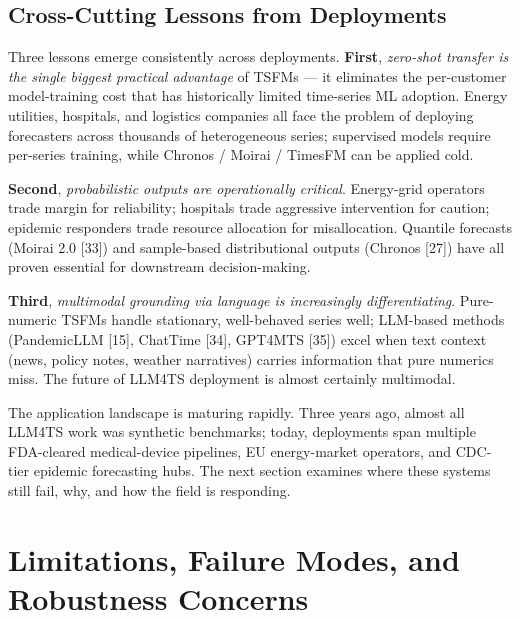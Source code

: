 \documentclass{article}
\begin{document}
\subsection{Cross-Cutting Lessons from Deployments}\label{cross-cutting-lessons-from-deployments}

Three lessons emerge consistently across deployments. \textbf{First}, \emph{zero-shot transfer is the single biggest practical advantage} of TSFMs --- it eliminates the per-customer model-training cost that has historically limited time-series ML adoption. Energy utilities, hospitals, and logistics companies all face the problem of deploying forecasters across thousands of heterogeneous series; supervised models require per-series training, while Chronos / Moirai / TimesFM can be applied cold.

\textbf{Second}, \emph{probabilistic outputs are operationally critical}. Energy-grid operators trade margin for reliability; hospitals trade aggressive intervention for caution; epidemic responders trade resource allocation for misallocation. Quantile forecasts (Moirai 2.0 {[}33{]}) and sample-based distributional outputs (Chronos {[}27{]}) have all proven essential for downstream decision-making.

\textbf{Third}, \emph{multimodal grounding via language is increasingly differentiating}. Pure-numeric TSFMs handle stationary, well-behaved series well; LLM-based methods (PandemicLLM {[}15{]}, ChatTime {[}34{]}, GPT4MTS {[}35{]}) excel when text context (news, policy notes, weather narratives) carries information that pure numerics miss. The future of LLM4TS deployment is almost certainly multimodal.

The application landscape is maturing rapidly. Three years ago, almost all LLM4TS work was synthetic benchmarks; today, deployments span multiple FDA-cleared medical-device pipelines, EU energy-market operators, and CDC-tier epidemic forecasting hubs. The next section examines where these systems still fail, why, and how the field is responding.

\section{Limitations, Failure Modes, and Robustness Concerns}\label{limitations-failure-modes-and-robustness-concerns}
\end{document}
